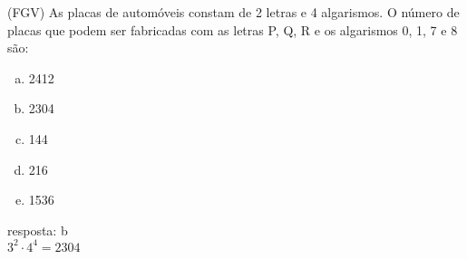 \begin{ex}
(FGV) As placas de automóveis constam de 2 letras e 4 algarismos. O número de placas que podem ser fabricadas com as letras P, Q, R e os algarismos 0, 1, 7 e 8 são:
   \begin{enumerate}[(a)]
   \item 2412
   \item 2304
   \item 144
   \item 216
   \item 1536
   \end{enumerate}
     \begin{sol}
       resposta: b \\
       $3^2\cdot4^4=2304$
     \end{sol}
\end{ex}